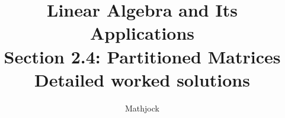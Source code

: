 
\title{\textbf{Linear Algebra and Its Applications}\\[0.3em]Section 2.4: Partitioned Matrices\\[0.3em]\large Detailed worked solutions}
\author{Mathjock}
\date{}

\maketitle
\bookinfo
\tableofcontents
\clearpage
\renewcommand{\thesection}{2.\arabic{section}}
\renewcommand{\theHsection}{2.\arabic{section}}
\setcounter{section}{3}


